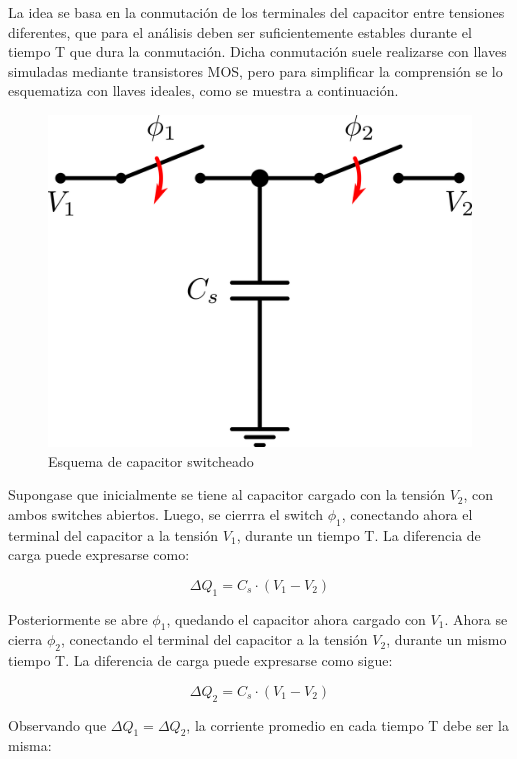 \documentclass[assd_tp3_main.tex]{subfiles}
\begin{document}
La idea se basa en la conmutación de los terminales del capacitor entre tensiones diferentes, que para el análisis deben ser suficientemente estables durante el tiempo T que dura la conmutación. Dicha conmutación suele realizarse con llaves simuladas mediante transistores MOS, pero para simplificar la comprensión se lo esquematiza con llaves ideales, como se muestra a continuación.

\begin{figure}[!ht]
\begin{centering}
\includegraphics[scale=0.5]{images/ej5/SCBasico.png}
\par\end{centering}
\caption{Esquema de capacitor switcheado}
\end{figure}

Supongase que inicialmente se tiene al capacitor cargado con la tensión $V_2$, con ambos switches abiertos. Luego, se cierrra el switch $\phi_1$, conectando ahora el terminal del capacitor a la tensión $V_1$, durante un tiempo T. La diferencia de carga puede expresarse como:

\[
\Delta Q_1 = C_s \cdot (V_1 - V_2)
\]

Posteriormente se abre $\phi_1$, quedando el capacitor ahora cargado con $V_1$. Ahora se cierra $\phi_2$, conectando el terminal del capacitor a la tensión $V_2$, durante un mismo tiempo T. La diferencia de carga puede expresarse como sigue:

\[
\Delta Q_2 = C_s \cdot (V_1 - V_2)
\]

Observando que $\Delta Q_1 = \Delta Q_2$, la corriente promedio en cada tiempo T debe ser la misma:
\end{document}
